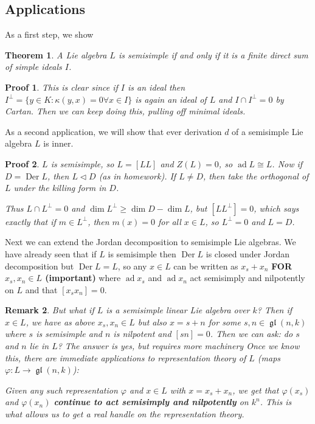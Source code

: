 \documentclass[12pt]{article}
\theoremstyle{nonumberbreak}
\theoremstyle{changebreak}
\newtheorem{thm}{Theorem}[subsection]
\theoremstyle{nonumberbreak}
\newtheorem{prf}{Proof}
\theoremstyle{change}
\newtheorem{rmk}[thm]{Remark}
\DeclareMathOperator{\gl}{\mathfrak{gl}}
\DeclareMathOperator{\ad}{ad}
\DeclareMathOperator{\Der}{Der}
\begin{document}
\subsection{Applications}
As a first step, we show 
\begin{thm}
	A Lie algebra $L$ is semisimple if and only if it is a finite direct sum of simple ideals $I$.
\end{thm}
\begin{prf}
	This is clear since if $I$ is an ideal then $I^\perp=\{y\in K:\kappa(y,x)=0\forall x\in I\}$
	is again an ideal of $L$ and $I\cap I^\perp=0$ by Cartan. Then we can keep doing this, pulling off minimal ideals.
\end{prf}

As a second application, we will show that ever derivation $d$ of a semisimple Lie algebra $L$ is inner.
\begin{prf}
	$L$ is semisimple, so $L=[LL]$ and $Z(L)=0$, so $\ad L\cong L$. Now if $D=\operatorname{Der} L$, then
	$L\lhd D$ (as in homework). If $L\ne D$, then take the orthogonal of $L$ under the killing form in $D$.

	Thus $L\cap L^\perp=0$ and $\dim L^\perp\ge\dim D-\dim L$, but $[LL^\perp]=0$, which says exactly that if $m\in L^\perp$, then $m(x)=0$
	for all $x\in L$, so $L^\perp=0$ and $L=D$.
\end{prf}

Next we can extend the Jordan decomposition to semisimple Lie algebras. We have already seen that if $L$ is semisimple then $\Der L$ is closed
under Jordan decomposition but $\Der L=L$, so any $x\in L$ can be written as $x_s+x_n$ \textbf{FOR $x_s,x_n\in L$ (important)} where $\ad x_s$ and $\ad x_n$
act semisimply and nilpotently on $L$ and that $[x_sx_n]=0.$

\begin{rmk}
But what if $L$ is a semisimple linear Lie algebra over $k$? Then if $x\in L$, we have  as above $x_s,x_n\in L$
but also $x=s+n$ for some $s,n\in\gl(n,k)$ where $s$ is semisimple and $n$ is nilpotent and $[sn]=0$. Then we can ask:
do $s$ and $n$ lie in $L$? The answer is yes, but requires more machinery Once we know this, there are immediate applications to 
representation theory of $L$ (maps $\varphi:L\to\gl(n,k)$):

Given any such representation $\varphi$ and $x\in L$ with $x=x_s+x_n$, we get that $\varphi(x_s)$ and $\varphi(x_n)$
\textbf{continue to act semisimply and nilpotently} on $k^n$. This is what allows us to get a real handle on the representation theory.
\end{rmk}
\end{document}
